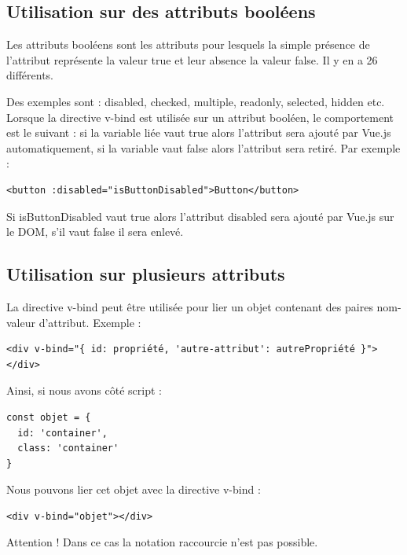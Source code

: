 \documentclass{article}
\begin{document}
\subsection{Utilisation sur des attributs booléens}
Les attributs booléens sont les attributs pour lesquels la simple présence de l'attribut représente la valeur true et leur absence la valeur false. Il y en a 26 différents.

Des exemples sont : disabled, checked, multiple, readonly, selected, hidden etc. Lorsque la directive v-bind est utilisée sur un attribut booléen, le comportement est le suivant : si la variable liée vaut true alors l'attribut sera ajouté par Vue.js automatiquement, si la variable vaut false alors l'attribut sera retiré. Par exemple :
\begin{verbatim}
<button :disabled="isButtonDisabled">Button</button>
\end{verbatim}

Si isButtonDisabled vaut true alors l'attribut disabled sera ajouté par Vue.js sur le DOM, s'il vaut false il sera enlevé.

\subsection{Utilisation sur plusieurs attributs}
La directive v-bind peut être utilisée pour lier un objet contenant des paires nom-valeur d'attribut. Exemple :
\begin{verbatim}
<div v-bind="{ id: propriété, 'autre-attribut': autrePropriété }"></div>
\end{verbatim}

Ainsi, si nous avons côté script :
\begin{verbatim}
const objet = {
  id: 'container',
  class: 'container'
}
\end{verbatim}

Nous pouvons lier cet objet avec la directive v-bind :
\begin{verbatim}
<div v-bind="objet"></div>
\end{verbatim}

Attention ! Dans ce cas la notation raccourcie n'est pas possible.
\end{document}
